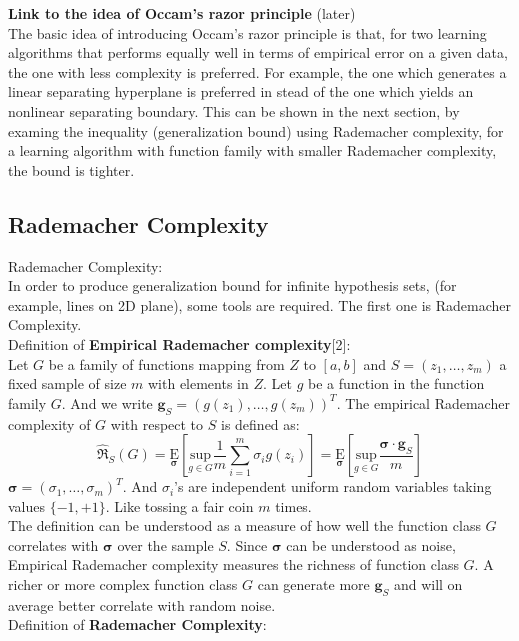 \documentclass[12pt]{article}
\theoremstyle{definition}
\theoremstyle{remark}
\numberwithin{equation}{section}
\begin{document}
\textbf{Link to the idea of Occam's razor principle} (later)\\[0.2cm]
The basic idea of introducing Occam's razor principle is that, for two learning algorithms that performs equally well in terms of empirical error on a given data, the one with less complexity is preferred. For example, the one which generates a linear separating hyperplane is preferred in stead of the one which yields an nonlinear separating boundary. This can be shown in the next section, by examing the inequality (generalization bound) using Rademacher complexity, for a learning algorithm with function family with smaller Rademacher complexity, the bound is tighter.
\subsection{Rademacher Complexity}
Rademacher Complexity: \\[0.2cm]
In order to produce generalization bound for infinite hypothesis sets, (for example, lines on 2D plane), some tools are required. The first one is Rademacher Complexity. \\[0.2cm]
Definition of \textbf{Empirical Rademacher complexity}[2]: \\[0.2cm]
Let $G$ be a family of functions mapping from $Z$ to $[a,b]$ and $S=(z_1,\dots,z_m)$ a fixed sample of size $m$ with elements in $Z$. Let $g$ be a function in the function family $G$. And we write $\mathbf{g}_S = (g(z_1),\dots,g(z_m))^T$. The empirical Rademacher complexity of $G$ with respect to $S$ is defined as:
\[\mathfrak{\widehat{R}}_S(G)=\underset{\mathbf{\sigma}}{\text{E}}[\underset{g \in G}{\text{sup}}\frac{1}{m}\sum_{i=1}^{m}\sigma_ig(z_i)]=\underset{\mathbf{\sigma}}{\text{E}}[\underset{g \in G}{\text{sup}}\frac{\mathbf{\sigma}\cdot\mathbf{g}_S}{m}]\]
$\mathbf{\sigma} = (\sigma_1,\dots, \sigma_m)^T$. And $\sigma_i$'s are independent uniform random variables taking values $\{-1,+1\}$. Like tossing a fair coin $m$ times. \\[0.2cm]
The definition can be understood as a measure of how well the function class $G$ correlates with $\mathbf{\sigma}$ over the sample $S$. Since $\mathbf{\sigma}$ can be understood as noise, Empirical Rademacher complexity measures the richness of function class $G$. A richer or more complex function class $G$ can generate more $\mathbf{g}_S$ and will on average better correlate with random noise.\\[0.2cm]
Definition of \textbf{Rademacher Complexity}: \\[0.2cm]
\end{document}
